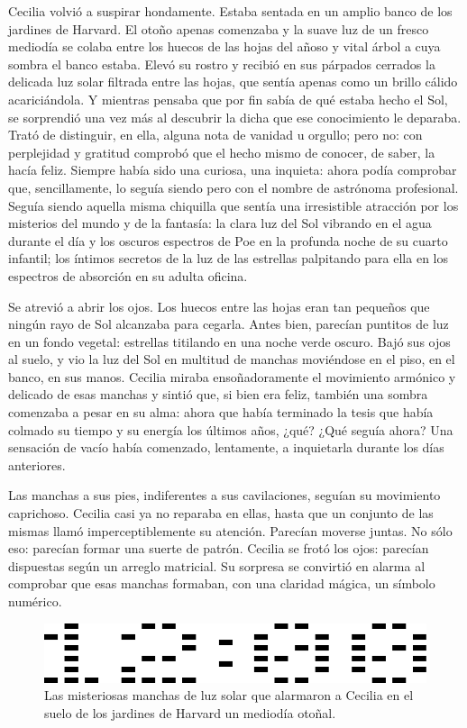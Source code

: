 Cecilia volvió a suspirar hondamente. Estaba sentada en un amplio
banco de los jardines de Harvard. El otoño apenas comenzaba y la suave
luz de un fresco mediodía se colaba entre los huecos de las hojas del
añoso y vital árbol a cuya sombra el banco estaba. Elevó su rostro y
recibió en sus párpados cerrados la delicada luz solar filtrada entre
las hojas, que sentía apenas como un brillo cálido acariciándola. Y
mientras pensaba que por fin sabía de qué estaba hecho el Sol, se
sorprendió una vez más al descubrir la dicha que ese conocimiento le
deparaba. Trató de distinguir, en ella, alguna nota de vanidad u
orgullo; pero no: con perplejidad y gratitud comprobó que el hecho
mismo de conocer, de saber, la hacía feliz. Siempre había sido una
curiosa, una inquieta: ahora podía comprobar que, sencillamente, lo
seguía siendo pero con el nombre de astrónoma profesional. Seguía
siendo aquella misma chiquilla que sentía una irresistible atracción
por los misterios del mundo y de la fantasía: la clara luz del Sol
vibrando en el agua durante el día y los oscuros espectros de Poe en
la profunda noche de su cuarto infantil; los íntimos secretos de la
luz de las estrellas palpitando para ella en los espectros de
absorción en su adulta oficina.

Se atrevió a abrir los ojos. Los huecos entre las hojas eran tan
pequeños que ningún rayo de Sol alcanzaba para cegarla. Antes bien,
parecían puntitos de luz en un fondo vegetal: estrellas titilando en
una noche verde oscuro. Bajó sus ojos al suelo, y vio la luz del Sol
en multitud de manchas moviéndose en el piso, en el banco, en sus
manos. Cecilia miraba ensoñadoramente el movimiento armónico y
delicado de esas manchas y sintió que, si bien era feliz, también una
sombra comenzaba a pesar en su alma: ahora que había terminado la
tesis que había colmado su tiempo y su energía los últimos años, ¿qué?
¿Qué seguía ahora? Una sensación de vacío había comenzado, lentamente,
a inquietarla durante los días anteriores.

Las manchas a sus pies, indiferentes a sus cavilaciones, seguían su
movimiento caprichoso. Cecilia casi ya no reparaba en ellas, hasta que
un conjunto de las mismas llamó imperceptiblemente su
atención. Parecían moverse juntas. No sólo eso: parecían formar una
suerte de patrón. Cecilia se frotó los ojos: parecían dispuestas según
un arreglo matricial. Su sorpresa se convirtió en alarma al comprobar
que esas manchas formaban, con una claridad mágica, un símbolo
numérico.

\begin{figure}[ht]
  \centering
  \includegraphics[width=.9\textwidth]{imagenes/digitos}
  \caption{Las misteriosas manchas de luz solar que alarmaron a
    Cecilia en el suelo de los jardines de Harvard un mediodía
    otoñal.}
  \label{fig:manchitas}
\end{figure}

